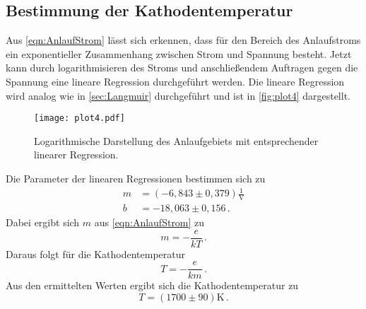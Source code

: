 \subsection{Bestimmung der Kathodentemperatur}
\label{sec:kathodetemp}
Aus \autoref{eqn:AnlaufStrom} lässt sich erkennen, dass für den Bereich des Anlaufstroms ein exponentieller
Zusammenhang zwischen Strom und Spannung besteht. Jetzt kann durch logarithmisieren des Stroms und
anschließendem Auftragen gegen die Spannung eine lineare Regression durchgeführt werden. Die lineare Regression
wird analog wie in \autoref{sec:Langmuir} durchgeführt und ist in \autoref{fig:plot4} dargestellt. 
\begin{figure}
  \centering
  \texttt{[image: plot4.pdf]}
  \caption{Logarithmische Darstellung des Anlaufgebiets mit entsprechender linearer Regression.}
  \label{fig:plot4}
\end{figure}
Die Parameter der linearen Regressionen bestimmen sich zu
\begin{align*}
  m &= (-6,843 \pm 0,379)\frac{1}{\si{\volt}} \\
  b &= -18,063 \pm 0,156\,.
\end{align*}
Dabei ergibt sich $m$ aus \autoref{eqn:AnlaufStrom} zu
\begin{equation*}
  m = -\frac{e}{kT}\,.
\end{equation*}
Daraus folgt für die Kathodentemperatur
\begin{equation*}
  T = -\frac{e}{km}\,.
\end{equation*}
Aus den ermittelten Werten ergibt sich die Kathodentemperatur zu
\begin{equation*}
  T = (1700 \pm 90)\si{\kelvin}\,.
\end{equation*}